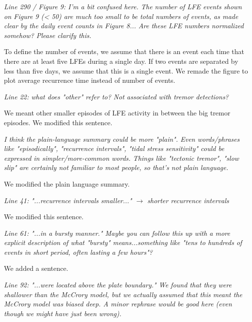 \documentclass[letterpaper, 12pt]{article}
\begin{document}
\bigskip

\textit{Line 290 / Figure 9: I'm a bit confused here. The number of LFE events shown on Figure 9 (< 50) are much too small to be total numbers of events, as made clear by the daily event counts in Figure 8... Are these LFE numbers normalized somehow? Please clarify this.} 

\bigskip

To define the number of events, we assume that there is an event each time that there are at least five LFEs during a single day. If two events are separated by less than five days, we assume that this is a single event. We remade the figure to plot average recurrence time instead of number of events.

\bigskip

\textit{Line 22: what does "other" refer to? Not associated with tremor detections?}

\bigskip

We meant other smaller episodes of LFE activity in between the big tremor episodes. We modified this sentence.

\bigskip

\textit{I think the plain-language summary could be more "plain". Even words/phrases like "episodically", "recurrence intervals", "tidal stress sensitivity" could be expressed in  simpler/more-common words. Things like "tectonic tremor", "slow slip" are certainly not familiar to most people, so that's not plain language.}

\bigskip

We modified the plain language summary.

\bigskip

\textit{Line 41: "...recurrence intervals smaller..." $\rightarrow$ shorter recurrence intervals}

\bigskip

We modified this sentence.

\bigskip

\textit{Line 61: "...in a bursty manner." Maybe you can follow this up with a more explicit description of what "bursty" means...something like "tens to hundreds of events in short period, often lasting a few hours"?}

\bigskip

We added a sentence.

\bigskip

\textit{Line 92: "...were located above the plate boundary." We found that they were shallower than the McCrory model, but we actually assumed that this meant the McCrory model was biased deep. A minor rephrase would be good here (even though we might have just been wrong).}
\end{document}
